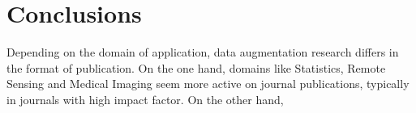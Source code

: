 \documentclass[parskip=full]{scrartcl}
\begin{document}
\section{Conclusions}

Depending on the domain of application, data augmentation research differs in
the format of publication. On the one hand, domains like Statistics, Remote
Sensing and Medical Imaging seem more active on journal publications,
typically in journals with high impact factor. On the other hand, 



\end{document}

